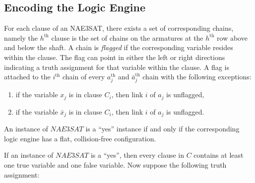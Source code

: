 \subsection{Encoding the Logic Engine}
For each clause of an NAE3SAT, there exists a set of corresponding chains, namely the $h^\text{th}$
clause is the set of chains on the armatures at the $h^\text{th}$ row above and below the shaft. A
chain is \textit{flagged} if the corresponding variable resides within the clause.  The flag can
point in either the left or right directions indicating a truth assignment for that variable within
the clause.  A flag is attached to the $i^\text{th}$ chain of every $a_j^\text{th}$ and
$\bar{a}_j^\text{th}$ chain with the following exceptions:
\begin{enumerate}
 \item if the variable $x_j$  is in clause $C_i$, then link $i$ of $a_j$ is unflagged,
 \item if the variable $\bar{x}_j$ is in clause $C_i$, then link $i$ of $a_j$ is unflagged.
\end{enumerate}
\begin{thm}\label{thm:Satisfiability-1}
 An instance of $NAE3SAT$ is a ``yes'' instance if and only if the corresponding logic engine has a
flat, collision-free configuration.
\end{thm}
\begin{pf}
 If an instance of $NAE3SAT$ is a ``yes'', then every clause in $C$ contains at least one true
variable and one false variable.  Now suppose the following truth assignment:
\end{pf}

